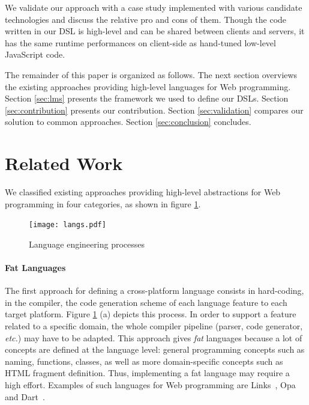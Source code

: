 \documentclass[preprint]{sigplanconf}
\newcommand{\etc}{\emph{etc.}}
\begin{document}
We validate our approach with a case study implemented with various candidate technologies and
discuss the relative pro and cons of them. Though the code written in our DSL is high-level and can
be shared between clients and servers, it has the same runtime performances on client-side as
hand-tuned low-level JavaScript code.

The remainder of this paper is organized as follows. The next section overviews the
existing approaches providing high-level languages for Web programming. Section \ref{sec:lms}
presents the framework we used to define our DSLs. Section \ref{sec:contribution} presents our
contribution. Section \ref{sec:validation} compares our solution to common approaches. Section
\ref{sec:conclusion} concludes.

\section{Related Work}
\label{sec:related-work}

We classified existing approaches providing high-level abstractions for Web programming in four
categories, as shown in figure \ref{fig:langs}.

\begin{figure}
\begin{center}
\texttt{[image: langs.pdf]}
\end{center}
\caption{Language engineering processes}
\label{fig:langs}
\end{figure}

\paragraph{Fat Languages}

The first approach for defining a cross-platform language consists in hard-coding, in the compiler,
the code generation scheme of each language feature to each target platform. Figure \ref{fig:langs}
(a) depicts this process. In order to support a feature related to a specific domain, the whole
compiler pipeline (parser, code generator, \etc) may have to be adapted. This approach gives
\emph{fat} languages because a lot of concepts are defined at the language level: general
programming concepts such as naming, functions, classes, as well as more domain-specific concepts
such as HTML fragment definition. Thus, implementing a fat language may require a high effort.
Examples of such languages for Web programming are Links~\cite{Cooper07_Links}, Opa and
Dart~\cite{Griffith11_Dart}.
\end{document}
